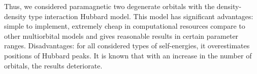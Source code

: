 Thus, we considered paramagnetic two degenerate orbitals with the density-density type interaction Hubbard model. This model has significant advantages: simple to implement, extremely cheap in computational resources compare to other multiorbital models and gives reasonable results in certain parameter ranges. Disadvantages: for all considered types of self-energies, it overestimates positions of Hubbard peaks. It is known that with an increase in the number of orbitals, the results deteriorate.
\FloatBarrier





